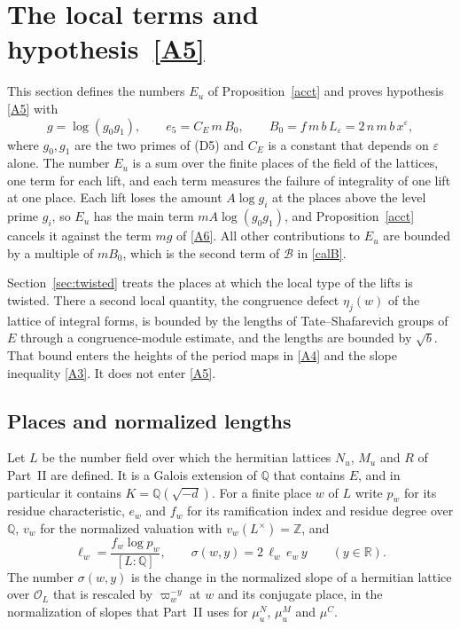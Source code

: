
\section{The local terms and hypothesis~\texorpdfstring{\eqref{A5}}{(A5)}}\label{r5:sec:localterms}

This section defines the numbers $E_u$ of Proposition~\ref{acct} and proves hypothesis \eqref{A5} with
\[
g=\log(g_0g_1),\qquad e_5=C_E\,m\,B_0,\qquad B_0=f\,m\,b\,L_\varepsilon=2\,n\,m\,b\,x^{\varepsilon},
\]
where $g_0,g_1$ are the two primes of (D5) and $C_E$ is a constant that depends on $\varepsilon$ alone. The number $E_u$ is a sum over the finite places of the field of the lattices, one term for each lift, and each term measures the failure of integrality of one lift at one place. Each lift loses the amount $A\log g_i$ at the places above the level prime $g_i$, so $E_u$ has the main term $mA\log(g_0g_1)$, and Proposition~\ref{acct} cancels it against the term $mg$ of \eqref{A6}. All other contributions to $E_u$ are bounded by a multiple of $mB_0$, which is the second term of $\mathcal B$ in \eqref{calB}.

Section~\ref{sec:twisted} treats the places at which the local type of the lifts is twisted. There a second local quantity, the congruence defect $\eta_j(w)$ of the lattice of integral forms, is bounded by the lengths of Tate--Shafarevich groups of $E$ through a congruence-module estimate, and the lengths are bounded by $\sqrt b$. That bound enters the heights of the period maps in \eqref{A4} and the slope inequality \eqref{A3}. It does not enter \eqref{A5}.

\subsection{Places and normalized lengths}\label{r5:sec:places}

Let $L$ be the number field over which the hermitian lattices $N_u$, $M_u$ and $R$ of Part~II are defined. It is a Galois extension of $\mathbb Q$ that contains $E$, and in particular it contains $K=\mathbb Q(\sqrt{-d})$. For a finite place $w$ of $L$ write $p_w$ for its residue characteristic, $e_w$ and $f_w$ for its ramification index and residue degree over $\mathbb Q$, $v_w$ for the normalized valuation with $v_w(L^\times)=\mathbb Z$, and
\[
\ell_w=\frac{f_w\log p_w}{[L:\mathbb Q]},\qquad\sigma(w,y)=2\,\ell_w\,e_w\,y\qquad(y\in\mathbb R).
\]
The number $\sigma(w,y)$ is the change in the normalized slope of a hermitian lattice over $\mathcal O_L$ that is rescaled by $\varpi_w^{-y}$ at $w$ and its conjugate place, in the normalization of slopes that Part~II uses for $\mu^N_u$, $\mu^M_u$ and $\mu^C$.

